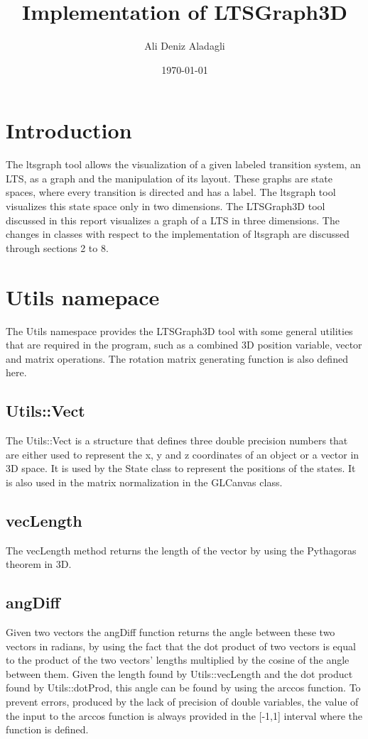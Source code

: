 \documentclass[a4paper]{article}
\begin{document}
\title{Implementation of LTSGraph3D}
\author{Ali Deniz Aladagli}
\date{\today}
\maketitle
\tableofcontents
\section{Introduction}
The ltsgraph tool allows the visualization of a given labeled transition system, an LTS, as a graph and the manipulation of its layout. These graphs are state spaces, where every transition is directed and has a label. The ltsgraph tool visualizes this state space only in two dimensions. The LTSGraph3D tool discussed in this report visualizes a graph of a LTS in three dimensions. The changes in classes with respect to the implementation of ltsgraph are discussed through sections 2 to 8. 
\section{Utils namepace}
The Utils namespace provides the LTSGraph3D tool with some general utilities that are required in the program, such as a combined 3D position variable, vector and matrix operations. The rotation matrix generating function is also defined here.
\subsection{Utils::Vect}
The Utils::Vect is a structure that defines three double precision numbers that are either used to represent the x, y and z coordinates of an object or a vector in 3D space. It is used by the State class to represent the positions of the states. It is also used in the matrix normalization in the GLCanvas class.
\subsection{vecLength}
The vecLength method returns the length of the vector by using the Pythagoras theorem in 3D.
\subsection{angDiff}
Given two vectors the angDiff function returns the angle between these two vectors in radians, by using the fact that the dot product of two vectors is equal to the product of the two vectors' lengths multiplied by the cosine of the angle between them. Given the length found by Utils::vecLength and the dot product found by Utils::dotProd, this angle can be found by using the arccos function. To prevent errors, produced by the lack of precision of double variables, the value of the input to the arccos function is always provided in the [-1,1] interval where the function is defined.
\end{document}

